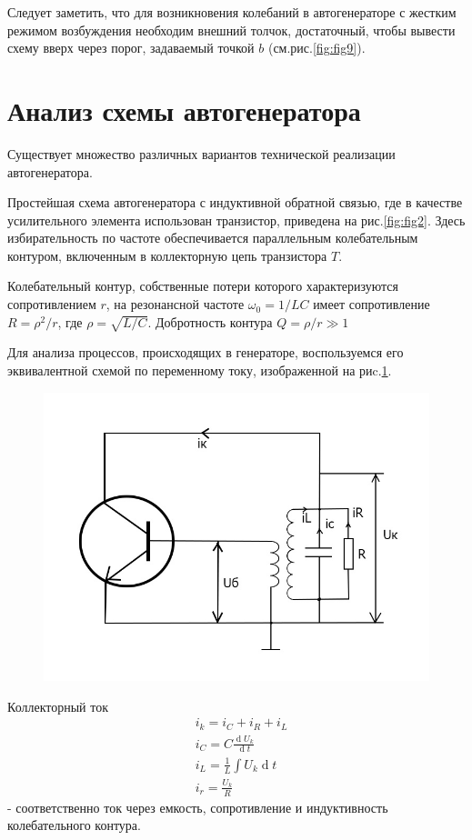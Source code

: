 Следует заметить, что для возникновения колебаний в автогенераторе с жестким режимом возбуждения необходим внешний толчок, достаточный, чтобы вывести схему вверх через порог, задаваемый точкой $b$ (см.рис.\ref{fig:fig9}).

\section{Анализ схемы автогенератора}

Существует множество различных вариантов технической реализации автогенератора.

Простейшая схема автогенератора с индуктивной обратной связью, где в качестве усилительного элемента использован транзистор, приведена на рис.\ref{fig:fig2}. Здесь избирательность по частоте обеспечивается параллельным колебательным контуром, включенным в коллекторную цепь транзистора $T$.

Колебательный контур, собственные потери которого характеризуются сопротивлением $r$, на резонансной частоте $\omega_0=1/{LC}$ имеет сопротивление $R=\rho^2/r$, где $\rho=\sqrt{L/C}$. Добротность контура $Q=\rho/r\gg1$

Для анализа процессов, происходящих в генераторе, воспользуемся его эквивалентной схемой по переменному току, изображенной на риc.\ref{fig:fig12}.

\begin{figure}[h]
	\centering
	\includegraphics[width=0.5\linewidth]{circuit/fig12}
	\caption{}
	\label{fig:fig12}
\end{figure}

Коллекторный ток
\begin{equation*}
\begin{aligned}
&i_k=i_C+i_R+i_L \\
&i_C=C\frac{\operatorname dU_k}{\operatorname dt} \\
&i_L=\frac{1}{L}\int U_k \operatorname dt \\
&i_r=\frac{U_k}{R}
\end{aligned}
\end{equation*}
- соответственно ток через емкость, сопротивление и индуктивность колебательного контура.

